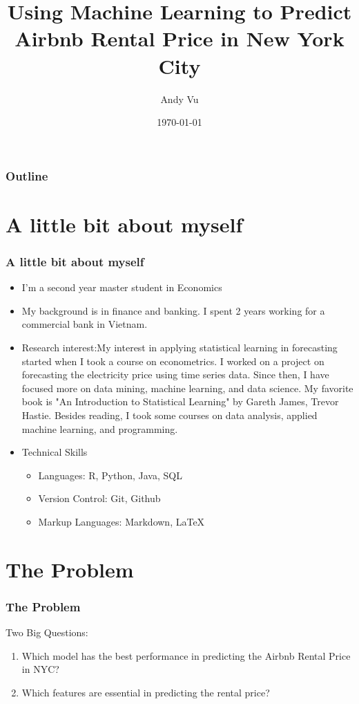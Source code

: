 \documentclass{beamer}
\title{Using Machine Learning to Predict Airbnb Rental Price in New York City}
\author{Andy Vu}
\institute{University of Trento}
\date{\today}
\begin{document}
\begin{frame}
\titlepage
\end{frame}

\begin{frame}
  \frametitle{Outline}
  \tableofcontents
\end{frame}

\section{A little bit about myself}

\begin{frame}
  \frametitle{A little bit about myself}
  \begin{itemize}
    \item I'm a second year master student in Economics
    \item My background is in finance and banking. I spent 2 years working for a
commercial bank in Vietnam.
    \item Research interest:My interest in applying statistical learning in
      forecasting started when I took a course on econometrics. I worked on a
      project on forecasting the electricity price using time series data. Since
      then, I have focused more on data mining, machine learning, and data
      science. My favorite book is "An Introduction to Statistical Learning" by
      Gareth James, Trevor Hastie. Besides reading, I took some courses on data
      analysis, applied machine learning, and programming.
    \item Technical Skills
      \begin{itemize}
        \item Languages: R, Python, Java, SQL
        \item Version Control: Git, Github
        \item Markup Languages: Markdown, \LaTeX

      \end{itemize}


\end{itemize}

\end{frame}

\section{The Problem}
\begin{frame}
  \frametitle{The Problem}
  Two Big Questions:
  \begin{enumerate}
    \item Which model has the best performance in predicting the Airbnb Rental
      Price in NYC?
    \item Which features are essential in predicting the rental price?
  \end{enumerate}
\end{frame}
\end{document}

